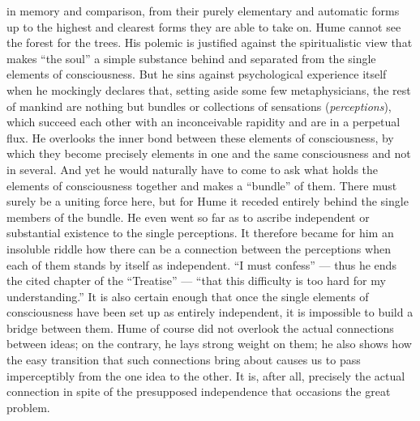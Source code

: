 \documentclass[12pt,a4paper]{book}
\newcommand{\opage}[1]{\marginnote{\footnotesize\textit{[#1]}}}
\begin{document}
in memory and comparison, from their purely elementary and automatic forms
up to the highest and clearest forms they are able to take on. Hume
cannot see the forest for the trees. His polemic is justified against the
spiritualistic view that makes ``the soul'' a simple substance behind
and separated from the single elements of consciousness. But he sins
against psychological experience itself when he mockingly declares that,
setting aside some few metaphysicians, the rest of mankind are nothing
but bundles or collections of sensations (\textit{perceptions}), which
succeed each other with an inconceivable rapidity and are in a perpetual
flux. He overlooks the inner bond between these elements of consciousness,
\opage{167}by which they become precisely elements in one and the same
consciousness and not in several. And yet he would naturally have to come
to ask what holds the elements of consciousness together and makes a
``bundle'' of them. There must surely be a uniting force here, but for
Hume it receded entirely behind the single members of the bundle. He even
went so far as to ascribe independent or substantial existence to the
single perceptions. It therefore became for him an insoluble riddle how
there can be a connection between the perceptions when each of them
stands by itself as independent. ``I must confess'' --- thus he ends the
cited chapter of the ``Treatise'' --- ``that this difficulty is too hard
for my understanding.'' It is also certain enough that once the single
elements of consciousness have been set up as entirely independent, it is
impossible to build a bridge between them. Hume of course did not overlook
the actual connections between ideas; on the contrary, he lays strong
weight on them; he also shows how the easy transition that such
connections bring about causes us to pass imperceptibly from the one idea
to the other. It is, after all, precisely the actual connection in spite
of the presupposed independence that occasions the great problem.
\end{document}
